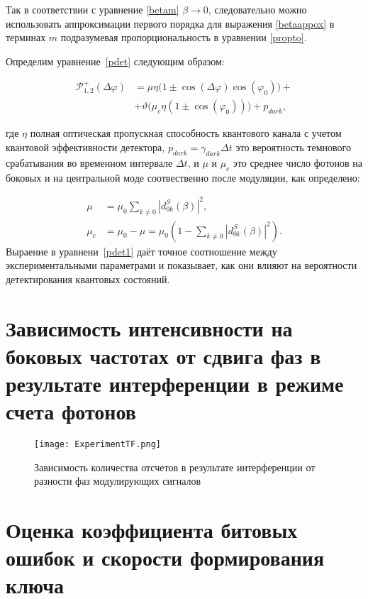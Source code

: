 Так в соответствии с уравнение \ref{betam} $\beta \rightarrow 0$, следовательно можно использовать аппроксимации первого порядка для выражения \ref{betaappox} в терминах $m$ подразумевая пропорциональность в уравнении \ref{propto}.


Определим уравнение~\ref{pdet} следующим образом:

\begin{align}\label{pdet1}
 \mathcal{P}_{1,2}^{+}(\Delta\varphi)&=\mu\eta\Big(1\pm\cos(\Delta\varphi)\cos(\varphi_0)\Big)+ \nonumber
 \\
 &+\vartheta\Big(\mu_c\eta(1\pm\cos(\varphi_0))\Big)+p_{dark},
\end{align}


где $\eta$ полная оптическая пропускная способность квантового канала с учетом квантовой эффективности детектора, $p_{dark}=\gamma_{dark}\Delta t$ это вероятность темнового срабатывания во временном интервале $\Delta t$, и $\mu$ и $\mu_c$ это среднее число фотонов на боковых и на центральной моде соотвественно после модуляции, как определено:

\begin{align}
    \mu&=\mu_0\sum_{k\neq 0}|d_{0k}^{S}(\beta)|^2, \\
    \mu_c&=\mu_0-\mu=\mu_0(1-\sum_{k\neq 0}|d_{0k}^{S}(\beta)|^2).
\end{align}
Выраение в уравнени~\ref{pdet1} даёт точное соотношение между экспериментальными параметрами и показывает, как они влияют на вероятности детектирования квантовых состояний. 


\pagebreak

\section{Зависимость интенсивности на боковых частотах от сдвига фаз в результате интерференции в режиме счета фотонов} \label{ch:ch5/sec7}


 \begin{figure}[ht]
  \centering
  \texttt{[image: ExperimentTF.png]}
  \caption{Зависимость количества отсчетов в результате интерференции от разности фаз модулирующих сигналов}
  \label{fig:Experimental_TF}
\end{figure}


\pagebreak

\section{Оценка коэффициента битовых ошибок и скорости формирования ключа} \label{ch:ch5/sect8}

